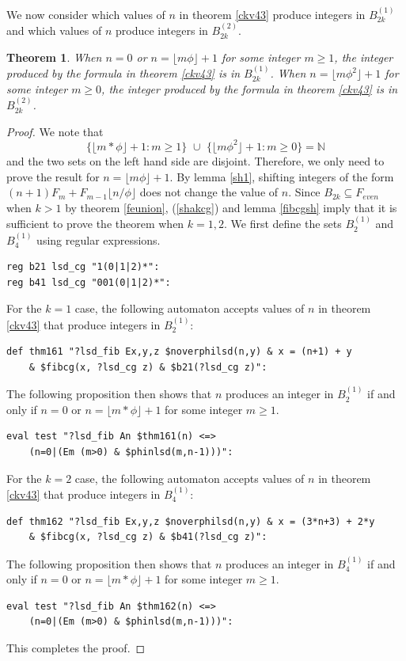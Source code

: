 \documentclass[12pt]{article}
\theoremstyle{plain}
\newtheorem{theorem}{Theorem}
\theoremstyle{case}
\theoremstyle{definition}
\begin{document}
We now consider which values of $n$ in theorem \ref{ckv43} produce integers in $B_{2k}^{(1)}$ and which values of $n$ produce integers in $B_{2k}^{(2)}$.

\bigskip

\begin{theorem}
When $n = 0$ or $n = \lfloor m \phi \rfloor + 1$ for some integer $m \geq 1$, the integer produced by the formula in theorem \ref{ckv43} is in $B_{2k}^{(1)}$. When $n = \lfloor m \phi^2 \rfloor + 1$ for some integer $m \geq 0$, the integer produced by the formula in theorem \ref{ckv43} is in $B_{2k}^{(2)}$.
\end{theorem}
\begin{proof}
We note that 
$$
\{  \lfloor m*\phi \rfloor  + 1 : m \geq 1 \} \,\, \cup \,\,  \{   \lfloor m \phi^2 \rfloor + 1 : m \geq 0 \} = \mathbb{N}
$$
and the two sets on the left hand side are disjoint. Therefore, we only need to prove the result for $n = \lfloor m \phi \rfloor + 1$. By lemma \ref{sh1}, shifting integers of the form  $(n+1) F_m + F_{m-1} \lfloor n/\phi \rfloor$ does not change the value of $n$. Since $B_{2k} \subseteq F_{even}$ when $k > 1$ by theorem \ref{feunion}, (\ref{shakcg}) and lemma \ref{fibcgsh} imply that it is sufficient to prove the theorem when $k = 1, 2$.
We first define the sets $B_{2}^{(1)}$ and $B_{4}^{(1)}$ using regular expressions.
\begin{verbatim}
reg b21 lsd_cg "1(0|1|2)*":
reg b41 lsd_cg "001(0|1|2)*":
\end{verbatim}
For the $k = 1$ case, the following automaton accepts values of $n$ in theorem \ref{ckv43} that produce integers in $B_{2}^{(1)}$:
\begin{verbatim}
def thm161 "?lsd_fib Ex,y,z $noverphilsd(n,y) & x = (n+1) + y
    & $fibcg(x, ?lsd_cg z) & $b21(?lsd_cg z)":
\end{verbatim}
The following proposition then shows that $n$ produces an integer in $B_{2}^{(1)}$ if and only if $n=0$ or $n = \lfloor m*\phi \rfloor  + 1$ for some integer $m \geq 1$.
\begin{verbatim}
eval test "?lsd_fib An $thm161(n) <=> 
    (n=0|(Em (m>0) & $phinlsd(m,n-1)))":
\end{verbatim}
For the $k = 2$ case, the following automaton accepts values of $n$ in theorem  \ref{ckv43} that produce integers in $B_{4}^{(1)}$:
\begin{verbatim}
def thm162 "?lsd_fib Ex,y,z $noverphilsd(n,y) & x = (3*n+3) + 2*y
    & $fibcg(x, ?lsd_cg z) & $b41(?lsd_cg z)":
\end{verbatim}
The following proposition then shows that $n$ produces an integer in $B_{4}^{(1)}$ if and only if $n=0$ or $n = \lfloor m*\phi \rfloor  + 1$ for some integer $m \geq 1$.
\begin{verbatim}
eval test "?lsd_fib An $thm162(n) <=> 
    (n=0|(Em (m>0) & $phinlsd(m,n-1)))": 
\end{verbatim}
This completes the proof.
\end{proof}
\end{document}
